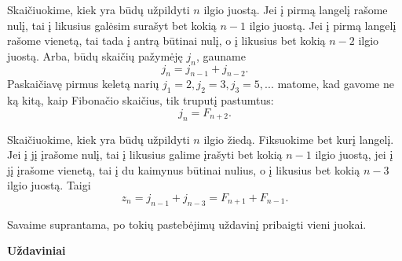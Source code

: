 Skaičiuokime, kiek yra būdų užpildyti $n$ ilgio juostą. Jei į pirmą langelį rašome nulį, tai į likusius galėsim surašyt bet kokią $n-1$ ilgio juostą. 
Jei į pirmą langelį rašome vienetą, tai tada į antrą būtinai nulį, o į likusius bet kokią $n-2$ ilgio juostą. Arba, būdų skaičių pažymėję $j_n$, gauname $$j_n = j_{n-1} + j_{n-2}.$$ Paskaičiavę pirmus keletą narių $j_1 = 2, j_2 = 3, j_3 = 5, ...$ matome, kad gavome ne ką kitą, kaip Fibonačio skaičius, tik truputį pastumtus: $$j_n = F_{n+2}.$$

Skaičiuokime, kiek yra būdų užpildyti $n$ ilgio žiedą. Fiksuokime bet kurį langelį. Jei į jį įrašome nulį, tai į likusius galime įrašyti bet kokią $n-1$ ilgio juostą, jei į jį įrašome vienetą, tai į du kaimynus būtinai nulius, o į likusius bet kokią $n-3$ ilgio juostą. Taigi $$z_n = j_{n-1} + j_{n-3} = F_{n+1} + F_{n-1}.$$ 

Savaime suprantama, po tokių pastebėjimų uždavinį pribaigti vieni juokai.

\newpage
\bigskip
\begin{center}\textbf{Uždaviniai}\end{center}

